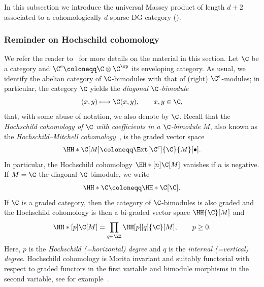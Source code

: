 \documentclass[a4paper]{amsart}
\begin{document}
In this subsection we introduce the universal Massey product of length $d+2$
associated to a cohomologically $d$-sparse DG category
().

\subsubsection{Reminder on Hochschild cohomology}

We refer the reader to~\cite[Sec.~1]{Mur22} for more details on the material in
this section. Let $\C$ be a category and $\C^e\coloneqq\C\otimes\C^\op$ its
enveloping category. As usual, we identify the abelian category of
$\C$-bimodules with that of (right) $\C^e$-modules; in particular, the category
$\C$ yields the \emph{diagonal $\C$-bimodule}
\[
  (x,y)\longmapsto\C(x,y),\qquad x,y\in\C,
\]
that, with some abuse of notation, we also denote by $\C$. Recall that the
\emph{Hochschild cohomology of $\C$ with coefficients in a $\C$-bimodule $M$},
also known as the \emph{Hochschild--Mitchell cohomology}~\cite{Mit72}, is the
graded vector space
\[
  \HH*{\C}[M]\coloneqq\Ext[\C^e]{\C}{M}[\bullet].
\]
In particular, the Hochschild cohomology $\HH*[n]{\C}[M]$ vanishes if $n$ is
negative. If $M=\C$ the diagonal $\C$-bimodule, we write
\[
  \HH*{\C}\coloneqq\HH*{\C}[\C].
\]
If $\C$ is a graded category, then the category of $\C$-bimodules is also graded
and the Hochschild cohomology is then a bi-graded vector space $\HH{\C}[M]$ and
\[
  \HH*[p]{\C}[M]=\prod_{q\in\ZZ}\HH[p][q]{\C}[M],\qquad p\geq0.
\]
Here, $p$ is the \emph{Hochschild (=horizontal) degree} and $q$ is the
\emph{internal (=vertical) degree}. Hochschild cohomology is Morita invariant
and suitably functorial with respect to graded functors in the first variable
and bimodule morphisms in the second variable, see for example~\cite{Mur06}.
\end{document}

